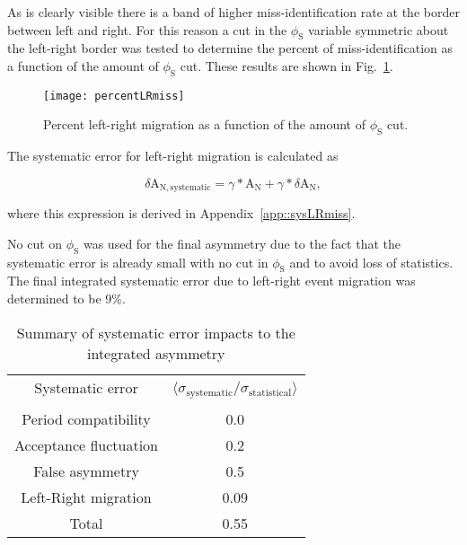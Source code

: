 \noindent
As is clearly visible there is a band of higher miss-identification rate at the
border between left and right.  For this reason a cut in the $\phi_{\mathrm{S}}$
variable symmetric about the left-right border was tested to determine the
percent of miss-identification as a function of the amount of
$\phi_{\mathrm{S}}$ cut.  These results are shown in
Fig.~\ref{fig::percentLRmiss}.

\begin{figure}[h!t]
  \centering
  \texttt{[image: percentLRmiss]}
  \caption{Percent left-right migration as a function of the amount of
    $\phi_{\mathrm{S}}$ cut.}
    \label{fig::percentLRmiss}
\end{figure}

The systematic error for left-right migration is calculated as

\begin{equation}
  \delta \mathrm{A}_{\mathrm{N,systematic}} = \gamma *\mathrm{A}_{\mathrm{N}} +
  \gamma *\delta \mathrm{A}_{\mathrm{N}},
\end{equation}

\noindent
where this expression is derived in Appendix~\ref{app::sysLRmiss}.\par

No cut on $\phi_{\mathrm{S}}$ was used for the final asymmetry due to the fact
that the systematic error is already small with no cut in $\phi_{\mathrm{S}}$
and to avoid loss of statistics.  The final integrated systematic error due to
left-right event migration was determined to be 9\%.


\begin{table}[h!t]
  \centering
  \begin{tabular}{|c|c|}
    \hline Systematic error& \multirow{2}{9em}{$\langle
      \sigma_{\mathrm{systematic}}/\sigma_{\mathrm{statistical}}
      \rangle$}\\ & \\ \hline
    
    Period compatibility& 0.0\\ \hline

    Acceptance fluctuation& 0.2\\ \hline

    False asymmetry& 0.5\\ \hline

    Left-Right migration& 0.09\\ \hline

    Total& 0.55\\\hline
    
  \end{tabular}
  \caption{Summary of systematic error impacts to the integrated asymmetry}
  \label{tab::sysError}
\end{table}
